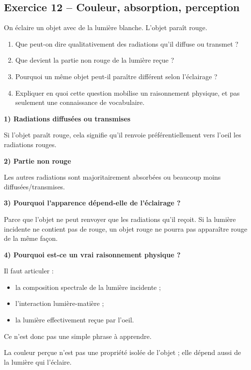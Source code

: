 \documentclass[11pt,a4paper]{article}
\begin{document}
\subsection{Exercice 12 -- Couleur, absorption, perception}

\begin{enoncebox}
On éclaire un objet avec de la lumière blanche.  
L'objet paraît rouge.

\begin{enumerate}[label=\arabic*)]
    \item Que peut-on dire qualitativement des radiations qu'il diffuse ou transmet ?
    \item Que devient la partie non rouge de la lumière reçue ?
    \item Pourquoi un même objet peut-il paraître différent selon l'éclairage ?
    \item Expliquer en quoi cette question mobilise un raisonnement physique, et pas seulement une connaissance de vocabulaire.
\end{enumerate}
\end{enoncebox}

\begin{corrigebox}
\textbf{1) Radiations diffusées ou transmises}

Si l'objet paraît rouge, cela signifie qu'il renvoie préférentiellement vers l'oeil les radiations rouges.

\textbf{2) Partie non rouge}

Les autres radiations sont majoritairement absorbées ou beaucoup moins diffusées/transmises.

\textbf{3) Pourquoi l'apparence dépend-elle de l'éclairage ?}

Parce que l'objet ne peut renvoyer que les radiations qu'il reçoit.  
Si la lumière incidente ne contient pas de rouge, un objet rouge ne pourra pas apparaître rouge de la même façon.

\textbf{4) Pourquoi est-ce un vrai raisonnement physique ?}

Il faut articuler :
\begin{itemize}
    \item la composition spectrale de la lumière incidente ;
    \item l'interaction lumière-matière ;
    \item la lumière effectivement reçue par l'oeil.
\end{itemize}
Ce n'est donc pas une simple phrase à apprendre.

\begin{bilanbox}
La couleur perçue n'est pas une propriété isolée de l'objet ; elle dépend aussi de la lumière qui l'éclaire.
\end{bilanbox}
\end{corrigebox}
\end{document}
